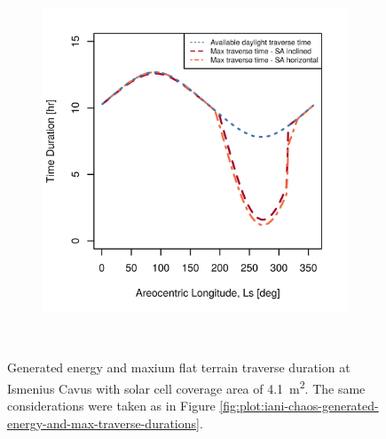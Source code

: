 \begin{figure}[h]
\begin{subfigure}[t]{\subfigureWidth}
        \includegraphics[height=\graphicsHeight]{sections/design/solar-array/plots/ismeniuscavus-75w-max-traverse-durations-for-solar-cell-coverage-area-41m2.png}
		\label{fig:plot:sub:ismenius-cavus-max-traverse-durations}
	\end{subfigure}\\[0.8ex]
    \caption[Generated energy and maxium flat terrain traverse durations at Ismenius Cavus]
            {Generated energy and maxium flat terrain traverse duration at Ismenius Cavus with solar cell coverage area of \SI{4.1}{m^{2}}. The same considerations were taken as in Figure \ref{fig:plot:iani-chaos-generated-energy-and-max-traverse-durations}.}
    \label{fig:plot:ismenius-cavus-generated-energy-and-max-traverse-durations}
\vspace{-2ex}
\end{figure}

